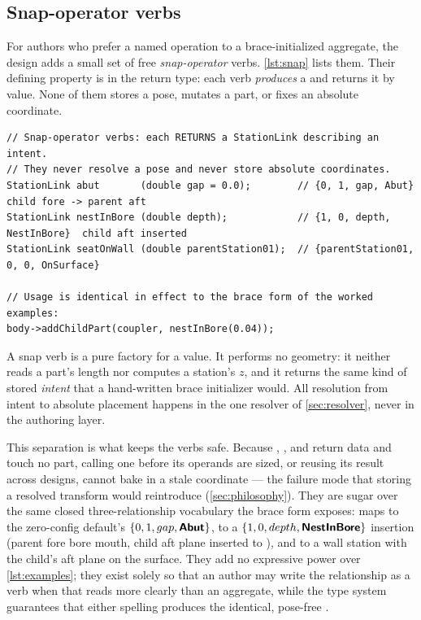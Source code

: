 \subsection{Snap-operator verbs}

For authors who prefer a named operation to a brace-initialized aggregate, the design adds
a small set of free \emph{snap-operator} verbs. \cref{lst:snap} lists them. Their defining
property is in the return type: each verb \emph{produces} a  and returns
it by value. None of them stores a pose, mutates a part, or fixes an absolute coordinate.

\begin{listing}[htbp]
\begin{verbatim}
// Snap-operator verbs: each RETURNS a StationLink describing an intent.
// They never resolve a pose and never store absolute coordinates.
StationLink abut       (double gap = 0.0);        // {0, 1, gap, Abut}  child fore -> parent aft
StationLink nestInBore (double depth);            // {1, 0, depth, NestInBore}  child aft inserted
StationLink seatOnWall (double parentStation01);  // {parentStation01, 0, 0, OnSurface}

// Usage is identical in effect to the brace form of the worked examples:
body->addChildPart(coupler, nestInBore(0.04));
\end{verbatim}
\caption{The snap-operator verbs. Each is a pure factory for a ; the
resolver alone turns intent into geometry.}\label{lst:snap}
\end{listing}

\begin{designrule}
A snap verb is a pure factory for a  value. It performs no geometry: it
neither reads a part's length nor computes a station's $z$, and it returns the same kind of
stored \emph{intent} that a hand-written brace initializer would. All resolution from
intent to absolute placement happens in the one resolver of \cref{sec:resolver}, never in
the authoring layer.
\end{designrule}

This separation is what keeps the verbs safe. Because , , and
 return data and touch no part, calling one before its operands are sized,
or reusing its result across designs, cannot bake in a stale coordinate --- the failure mode
that storing a resolved transform would reintroduce (\cref{sec:philosophy}). They are
sugar over the same closed three-relationship vocabulary the brace form exposes:
 maps to the zero-config default's $\{0, 1, gap, \textsf{\textbf{Abut}}\}$, 
to a $\{1, 0, depth, \textsf{\textbf{NestInBore}}\}$ insertion (parent fore bore mouth, child aft plane
inserted to ), and  to a wall station with the child's aft plane on
the surface. They add no expressive power over
\cref{lst:examples}; they exist solely so that an author may write the relationship as a
verb when that reads more clearly than an aggregate, while the type system guarantees that
either spelling produces the identical, pose-free .

